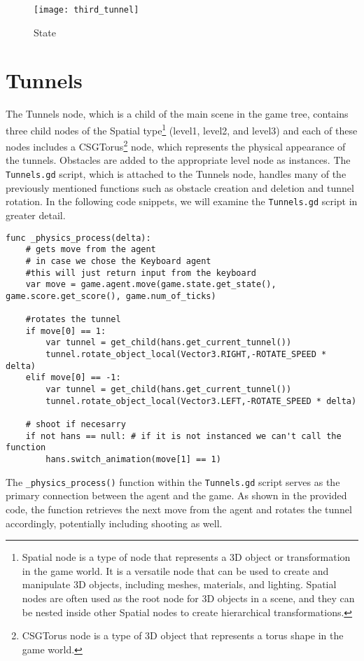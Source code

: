 \begin{figure}[h]
    \centering
    \texttt{[image: third\_tunnel]}
    \caption{State}
    \label{fig:third_tunnel}
\end{figure}

\section{Tunnels}
\label{tunnel_script}
The Tunnels node, which is a child of the main scene in the game tree, contains three child nodes of the Spatial type\footnote{Spatial node is a type of node that represents a 3D object or transformation in the game world. It is a versatile node that can be used to create and manipulate 3D objects, including meshes, materials, and lighting. Spatial nodes are often used as the root node for 3D objects in a scene, and they can be nested inside other Spatial nodes to create hierarchical transformations.} (level1, level2, and level3) and each of these nodes includes a CSGTorus\footnote{ CSGTorus node is a type of 3D object that represents a torus shape in the game world.} node, which represents the physical appearance of the tunnels. Obstacles are added to the appropriate level node as instances. The \texttt{Tunnels.gd} script, which is attached to the Tunnels node, handles many of the previously mentioned functions such as obstacle creation and deletion and tunnel rotation. In the following code snippets, we will examine the \texttt{Tunnels.gd} script in greater detail.

\begin{lstlisting}
func _physics_process(delta):   
	# gets move from the agent
	# in case we chose the Keyboard agent 
	#this will just return input from the keyboard
    var move = game.agent.move(game.state.get_state(), game.score.get_score(), game.num_of_ticks)
    
    #rotates the tunnel
    if move[0] == 1:
        var tunnel = get_child(hans.get_current_tunnel())
        tunnel.rotate_object_local(Vector3.RIGHT,-ROTATE_SPEED * delta)
    elif move[0] == -1:
        var tunnel = get_child(hans.get_current_tunnel())
        tunnel.rotate_object_local(Vector3.LEFT,-ROTATE_SPEED * delta)
        
    # shoot if necesarry
    if not hans == null: # if it is not instanced we can't call the function       
        hans.switch_animation(move[1] == 1)
\end{lstlisting}

The \texttt{\_physics\_process()} function within the \texttt{Tunnels.gd} script serves as the primary connection between the agent and the game. As shown in the provided code, the function retrieves the next move from the agent and rotates the tunnel accordingly, potentially including shooting as well.

